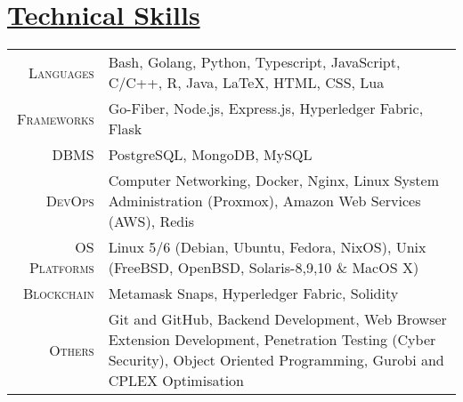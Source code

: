 \documentclass[a4paper,10pt]{extarticle} %
\begin{document}
\begin{itemize}[leftmargin=0.55cm, rightmargin=0.2cm, label={\Large\textbullet}]

\end{itemize}

 \vspace{+0.4cm} \section{\textcolor{primary}{\href{https://www.github.com/proffapt/bodhitree}{Technical Skills}}}

 \vspace{+0.2cm}

 \begin{tabular}{r|p{15cm}}
 \textsc{Languages} & Bash, Golang, Python, Typescript, JavaScript, C/C++, R, Java, LaTeX, HTML, CSS, Lua\\
 \textsc{Frameworks} & Go-Fiber, Node.js, Express.js, Hyperledger Fabric, Flask \\
 \textsc{DBMS} & PostgreSQL, MongoDB, MySQL \\
 \textsc{DevOps} & Computer Networking, Docker, Nginx, Linux System Administration (Proxmox), Amazon Web Services (AWS), Redis \\
 \textsc{OS Platforms} & Linux 5/6 (Debian, Ubuntu, Fedora, NixOS), Unix (FreeBSD, OpenBSD, Solaris-8,9,10 \& MacOS X) \\
 \textsc{Blockchain} & Metamask Snaps, Hyperledger Fabric, Solidity \\
 \textsc{Others} & Git and GitHub, Backend Development, Web Browser Extension Development, Penetration Testing (Cyber Security), Object Oriented Programming, Gurobi and CPLEX Optimisation \\
 
 
\end{tabular}

\end{document}
